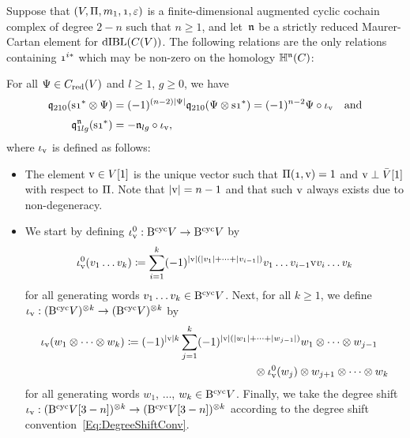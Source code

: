 \documentclass[\MainFolder/Text.tex]{subfiles}
\begin{document}
\begin{Proposition}\label{Prop:Ones}
Suppose that $(V,\Pair,m_1,\NOne,\varepsilon)$ is a finite-dimensional augmented cyclic cochain complex of degree $2-n$ such that $n\ge 1$, and let~$\mathfrak{n}$ be a strictly reduced Maurer-Cartan element for $\mathrm{dIBL}(C(V))$. The following relations are the only relations containing $\NOne^{i*}$ which may be non-zero on the homology $\mathbb{H}^{\mathfrak{n}}(C)$: 

For all $\Psi \in C_{\mathrm{red}}(V)$ and $l\ge 1$, $g\ge 0$, we have
\begin{align*}
\OPQ_{210}(\Susp\NOne^* \otimes \Psi) &= (-1)^{(n-2)\Abs{\Psi}} \OPQ_{210}(\Psi \otimes \Susp\NOne^*)  = (-1)^{n-2}\Psi \circ \iota_\NVol\quad\text{and} \\[\jot]
\OPQ_{1lg}^\PMC(\Susp\NOne^*) & = - \PMC_{lg} \circ \iota_\NVol,
\end{align*}
where $\iota_{\mathrm{v}}$ is defined as follows:
\begin{itemize}
\item The element $\mathrm{v} \in V[1]$ is the unique vector such that $\Pair(\NOne,\NVol) = 1$ and $\mathrm{v} \perp \bar{V}[1]$ with respect to $\Pi$. Note that $|\mathrm{v}| = n-1$ and that such $\mathrm{v}$ always exists due to non-degeneracy.
\item We start by defining $\iota_{\mathrm{v}}^0 : \mathrm{B}^{\mathrm{cyc}} V \rightarrow \mathrm{B}^{\mathrm{cyc}} V$ by
$$ \iota_{\mathrm{v}}^0(v_1\dots v_k) \coloneqq \sum_{i=1}^k (-1)^{|\mathrm{v}|(|v_1| + \dotsb + |v_{i-1}|)} v_1 \dots v_{i-1} \mathrm{v} v_i \dots v_k $$
for all generating words $v_1 \dots v_k \in \mathrm{B}^{\mathrm{cyc}} V$. Next, for all $k\ge 1$, we define $\iota_{\mathrm{v}} : (\mathrm{B}^{\mathrm{cyc}} V)^{\otimes k} \rightarrow (\mathrm{B}^{\mathrm{cyc}} V)^{\otimes k}$ by
$$ \iota_\NVol(w_1 \otimes \dotsb \otimes w_k) \coloneqq  \begin{multlined}[t](-1)^{\Abs{\NVol}k}\sum_{j=1}^k (-1)^{\Abs{\NVol}(\Abs{w_1} + \dotsb + \Abs{w_{j-1}})} w_1 \otimes \dotsb \otimes w_{j-1} \\ \otimes  \iota_\NVol^0(w_j) \otimes w_{j+1} \otimes \dotsb \otimes w_k \end{multlined}$$
for all generating words $w_1$, $\dotsc$, $w_k \in \mathrm{B}^{\mathrm{cyc}} V$. Finally, we take the degree shift $\iota_{\mathrm{v}}: (\mathrm{B}^{\mathrm{cyc}} V[3-n])^{\otimes k} \rightarrow (\mathrm{B}^{\mathrm{cyc}} V[3-n])^{\otimes k}$ according to the degree shift convention~\eqref{Eq:DegreeShiftConv}. 
\end{itemize}
\end{Proposition}
\end{document}
